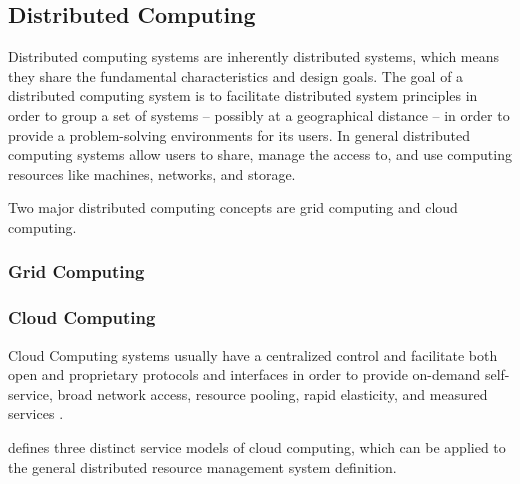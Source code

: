 \subsection{Distributed Computing}

Distributed computing systems are inherently distributed systems, which means
they share the fundamental characteristics and design goals. The goal of a
distributed computing system is to facilitate distributed system principles in
order to group a set of systems -- possibly at a geographical distance -- in
order to provide a problem-solving environments for its users. In general
distributed computing systems allow users to share, manage the access to, and
use computing resources like machines, networks, and storage.

Two major distributed computing concepts are grid computing and cloud computing.

\subsubsection{Grid Computing}


\subsubsection{Cloud Computing}

Cloud Computing systems usually have a centralized control and facilitate both
open and proprietary protocols and interfaces in order to provide on-demand
self-service, broad network access, resource pooling, rapid elasticity, and
measured services \cite{mell2011}.

 \cite{mell2011} defines three distinct service models of
cloud computing, which can be applied to the general distributed resource
management system definition.

